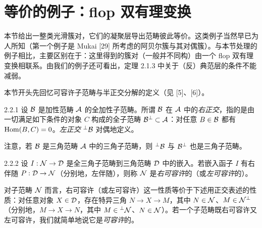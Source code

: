 \section{等价的例子：flop 双有理变换}


本节给出一整类光滑簇对，它们的凝聚层导出范畴彼此等价。这类例子当然早已为人所知（第一个例子是 Mukai [29] 所考虑的阿贝尔簇与其对偶簇）。与本节处理的例子相比，主要区别在于：这里得到的簇对（一般并不同构）由一个 flop 双有理变换相联系。由我们的例子还可看出，定理 2.1.3 中关于（反）典范层的条件不能减弱。

本节开头先回忆可容许子范畴与半正交分解的定义（见 [5]、[6]）。

\begin{definition}{2.2.1}
设 $\mathcal{B}$ 是加性范畴 $\mathcal{A}$ 的全加性子范畴。所谓 $\mathcal{B}$ 在 $\mathcal{A}$ 中的\emph{右正交}，指的是由一切满足如下条件的对象 $C$ 构成的全子范畴 $\mathcal{B}^{\perp}\subset\mathcal{A}$：对任意 $B\in\mathcal{B}$ 都有 $\operatorname{Hom}(B,C)=0$。\emph{左正交} ${}^{\perp}\mathcal{B}$ 对偶地定义。
\end{definition}

注意，若 $\mathcal{B}$ 是三角范畴 $\mathcal{A}$ 中的三角子范畴，则 ${}^{\perp}\mathcal{B}$ 与 $\mathcal{B}^{\perp}$ 也是三角子范畴。

\begin{definition}{2.2.2}
设 $I:\mathcal{N}\to\mathcal{D}$ 是全三角子范畴到三角范畴 $\mathcal{D}$ 中的嵌入。若嵌入函子 $I$ 有右伴随 $P:\mathcal{D}\to\mathcal{N}$（分别地，左伴随），则称 $\mathcal{N}$ 是\emph{右可容许}的（或\emph{左可容许}的）。
\end{definition}


对子范畴 $\mathcal{N}$ 而言，右可容许（或左可容许）这一性质等价于下述用正交表述的性质：对任意对象 $X\in\mathcal{D}$，存在特异三角 $N\to X\to M$，其中 $N\in\mathcal{N}$、$M\in\mathcal{N}^{\perp}$（分别地，$M\to X\to N$，其中 $M\in{}^{\perp}\mathcal{N}$、$N\in\mathcal{N}$）。若一个子范畴既右可容许又左可容许，我们就简单地说它是\emph{可容许}的。

